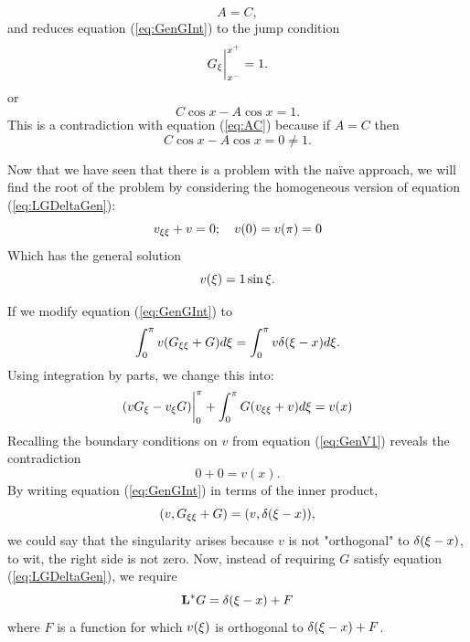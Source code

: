     \begin{equation}\label{eq:AC}
        A=C,
    \end{equation}
    and reduces equation (\ref{eq:GenGInt}) to the jump condition 
    \begin{equation}\label{eq:genJump}
        G_\xi\biggr\rvert_{x^-}^{x^+} = 1.
    \end{equation}
    or
    \begin{equation*}
        C\cos x - A\cos x = 1.
    \end{equation*}
    This is a contradiction with equation (\ref{eq:AC}) because if \(A=C\) then 
    \begin{equation*}
        C\cos x -A\cos x = 0 \neq 1.
    \end{equation*}

    Now that we have seen that there is a problem with the na\"ive approach, we will find the root of the problem by considering the homogeneous version of equation (\ref{eq:LGDeltaGen}):
    \begin{equation}\label{eq:GenV1}
        v_{\xi\xi} + v = 0;\quad v(0)=v(\pi)=0
    \end{equation}
    Which has the general solution 
    \begin{equation*}
        v(\xi) = 1 \sin \xi.
    \end{equation*}

    If we modify equation (\ref{eq:GenGInt}) to 
    \begin{equation}\label{eq:innerCont}
            \int_{0}^{\pi} v(G_{\xi\xi}+G) d\xi = \int_{0}^{\pi} v\delta(\xi-x) d\xi.
    \end{equation}
    Using integration by parts, we change this into:
    \begin{equation*}
        (vG_\xi - v_\xi G)\biggr\rvert_{0}^{\pi} + \int_{0}^{\pi} G(v_{\xi\xi}+v)d\xi = v(x) 
    \end{equation*}
    Recalling the boundary conditions on \(v\) from equation (\ref{eq:GenV1}) reveals the contradiction
    \begin{equation*}
        0+0 = v(x).
    \end{equation*}
    By writing equation (\ref{eq:GenGInt}) in terms of the inner product,
    \begin{equation*}
        (v, G_{\xi\xi}+G) = (v, \delta(\xi-x)),
    \end{equation*}
    we could say that the singularity arises because \(v\) is not "orthogonal" to \(\delta(\xi-x)\), to wit, the right side is not zero. Now, instead of requiring \(G\) satisfy equation (\ref{eq:LGDeltaGen}), we require
    \begin{equation}\label{eq:GenCorrection}
        \mathrm{\bf{L^*}} G = \delta(\xi-x) + F
    \end{equation}
    where \(F\) is a function for which \(v(\xi)\) is orthogonal to \(\delta(\xi-x) + F\). 

